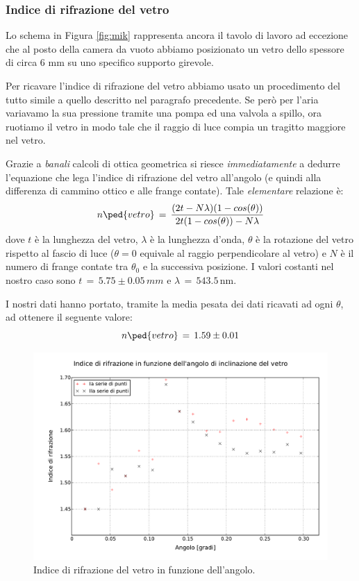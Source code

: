 \subsubsection{Indice di rifrazione del vetro}


Lo schema in Figura \ref{fig:mik} rappresenta ancora il tavolo di lavoro ad eccezione che al posto della camera da vuoto abbiamo posizionato un vetro dello spessore di circa 6 \si{\milli\metre} su uno specifico supporto girevole.

Per ricavare l'indice di rifrazione del vetro abbiamo usato un procedimento del tutto simile a quello descritto nel paragrafo precedente.
Se però per l'aria variavamo la sua pressione tramite una pompa ed una valvola a spillo, ora ruotiamo il vetro in modo tale che il raggio di luce compia un tragitto maggiore nel vetro. %

Grazie a \emph{banali} calcoli di ottica geometrica si riesce \emph{immediatamente} a dedurre l'equazione che lega l'indice di rifrazione del vetro all'angolo (e quindi alla differenza di cammino ottico e alle frange contate). Tale \emph{elementare} relazione è:
\begin{equation}
	n\ped{vetro} \, = \, \frac{(2t - N \lambda) (1 - cos(\theta))}{2t(1-cos(\theta))-N\lambda}
\end{equation}
dove $t$ è la lunghezza del vetro, $\lambda$ è la lunghezza d'onda, $\theta$ è la rotazione del vetro rispetto al fascio di luce
($\theta = 0$ equivale al raggio perpendicolare al vetro)
e $N$ è il numero di frange contate tra $\theta_0$ e la successiva posizione.
I valori costanti nel nostro caso sono $t \,=\, 5.75 \pm 0.05 \, mm$ e $\lambda \, = \, 543.5 \, \si{\nano\metre}$.

I nostri dati hanno portato, tramite la media pesata dei dati ricavati ad ogni $\theta$, ad ottenere il seguente valore:
\begin{equation}
	n\ped{vetro} \, = \, 1.59 \pm 0.01
\end{equation}

\begin{figure}[t]
    \centering
        \includegraphics[width=\textwidth]{lol.pdf}
        \caption{Indice di rifrazione del vetro in funzione dell'angolo.}
        \label{fig:enne_theta}
\end{figure}
